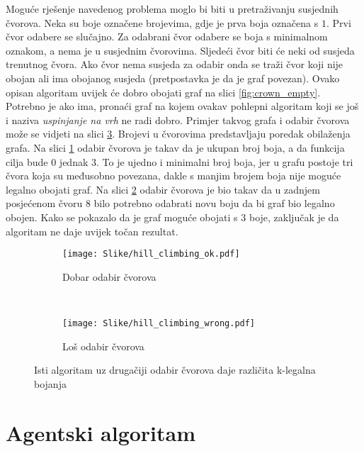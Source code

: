 \documentclass[times, utf8, diplomski, numeric]{fer}
\begin{document}
Moguće rješenje navedenog problema moglo bi biti u pretraživanju susjednih čvorova. Neka su boje označene brojevima, gdje je prva boja označena s $1$. Prvi čvor odabere se slučajno. Za odabrani čvor odabere se boja s minimalnom oznakom, a nema je u susjednim čvorovima. Sljedeći čvor biti će neki od susjeda trenutnog čvora. Ako čvor nema susjeda za odabir onda se traži čvor koji nije obojan ali ima obojanog susjeda (pretpostavka je da je graf povezan). Ovako opisan algoritam uvijek će dobro obojati graf na slici \ref{fig:crown_empty}. Potrebno je ako ima, pronaći graf na kojem ovakav pohlepni algoritam koji se još i naziva \emph{uspinjanje na vrh} ne radi dobro. Primjer takvog grafa i odabir čvorova može se vidjeti na slici \ref{fig:hill_climbing}. Brojevi u čvorovima predstavljaju poredak obilaženja grafa. Na slici \ref{fig:hill_climbing_ok} odabir čvorova je takav da je ukupan broj boja, a da funkcija cilja bude $0$ jednak $3$. To je ujedno i minimalni broj boja, jer u grafu postoje tri čvora koja su međusobno povezana, dakle s manjim brojem boja nije moguće legalno obojati graf. Na slici \ref{fig:hill_climbing_wrong} odabir čvorova je bio takav da u zadnjem posjećenom čvoru $8$ bilo potrebno odabrati novu boju da bi graf bio legalno obojen. Kako se pokazalo da je graf moguće obojati s $3$ boje, zaključak je da algoritam ne daje uvijek točan rezultat.

\begin{figure}
        \centering
        \begin{subfigure}[b]{0.4\textwidth}
                \texttt{[image: Slike/hill\_climbing\_ok.pdf]}
                \caption{Dobar odabir čvorova}
                \label{fig:hill_climbing_ok}
        \end{subfigure}
        ~
        \begin{subfigure}[b]{0.4\textwidth}
                \texttt{[image: Slike/hill\_climbing\_wrong.pdf]}
                \caption{Loš odabir čvorova}
                \label{fig:hill_climbing_wrong}
        \end{subfigure}
        \caption{Isti algoritam uz drugačiji odabir čvorova daje različita k-legalna bojanja}
        \label{fig:hill_climbing}
\end{figure}



\section{Agentski algoritam}
\end{document}
